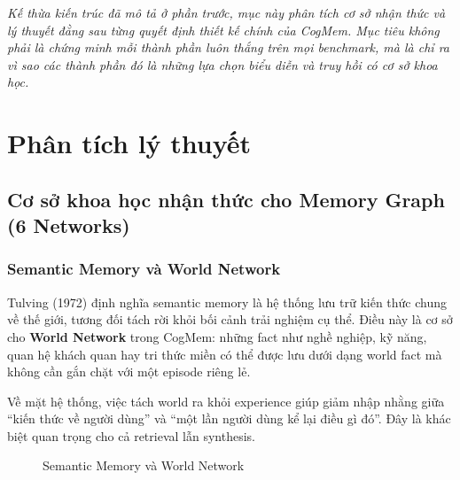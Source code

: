 \documentclass[../main.tex]{subfiles}
\begin{document}
\textit{Kế thừa kiến trúc đã mô tả ở phần trước, mục này phân tích cơ sở nhận thức và lý thuyết đằng sau từng quyết định thiết kế chính của CogMem. Mục tiêu không phải là chứng minh mỗi thành phần luôn thắng trên mọi benchmark, mà là chỉ ra vì sao các thành phần đó là những lựa chọn biểu diễn và truy hồi có cơ sở khoa học.}

\section{Phân tích lý thuyết}

\subsection{Cơ sở khoa học nhận thức cho Memory Graph (6 Networks)}

\subsubsection{Semantic Memory và World Network}

Tulving (1972) định nghĩa semantic memory là hệ thống lưu trữ kiến thức chung về thế giới, tương đối tách rời khỏi bối cảnh trải nghiệm cụ thể. Điều này là cơ sở cho \textbf{World Network} trong CogMem: những fact như nghề nghiệp, kỹ năng, quan hệ khách quan hay tri thức miền có thể được lưu dưới dạng world fact mà không cần gắn chặt với một episode riêng lẻ.

Về mặt hệ thống, việc tách world ra khỏi experience giúp giảm nhập nhằng giữa ``kiến thức về người dùng'' và ``một lần người dùng kể lại điều gì đó''. Đây là khác biệt quan trọng cho cả retrieval lẫn synthesis.

\begin{figure}[H]
\centering
{}
\caption{Semantic Memory và World Network}
\label{fig:ch4_semantic_memory}
\end{figure}
\end{document}
